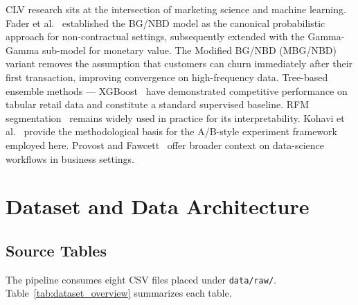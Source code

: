 \documentclass[conference]{IEEEtran}
\begin{document}
CLV research sits at the intersection of marketing science and
machine learning. Fader et al.~\cite{fader2005} established the
BG/NBD model as the canonical probabilistic approach for
non-contractual settings, subsequently extended with the
Gamma-Gamma sub-model for monetary value. The Modified BG/NBD
(MBG/NBD) variant removes the assumption that customers can
churn immediately after their first transaction, improving
convergence on high-frequency data. Tree-based ensemble
methods — XGBoost~\cite{chen2016} have demonstrated competitive performance on tabular retail data
and constitute a standard supervised baseline. RFM
segmentation~\cite{hughes1994} remains widely used in practice
for its interpretability. Kohavi et al.~\cite{kohavi2020} provide
the methodological basis for the A/B-style experiment framework
employed here. Provost and Fawcett~\cite{provost2013} offer
broader context on data-science workflows in business settings.

\section{Dataset and Data Architecture}
\label{sec:data}

\subsection{Source Tables}

The pipeline consumes eight CSV files placed under
\texttt{data/raw/}. Table~\ref{tab:dataset_overview} summarizes each table.
\end{document}
